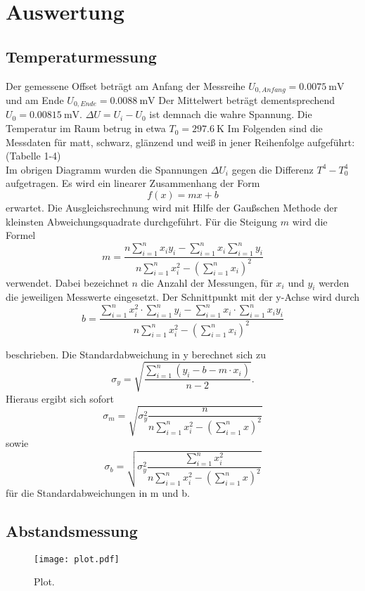 \section{Auswertung}
\label{sec:Auswertung}

\subsection{Temperaturmessung}
Der gemessene Offset beträgt am Anfang der Messreihe $U_{0,Anfang} = \SI{0,0075}{\milli\volt}$ und am Ende $U_{0,Ende} = \SI{0,0088}{\milli\volt}$
Der Mittelwert beträgt dementsprechend $U_0 = \SI{0.00815}{\milli\volt}$.
$\Delta U = U_i - U_0$ ist demnach die wahre Spannung.
Die Temperatur im Raum betrug in etwa $T_0 = \SI{297,6}{\kelvin}$
Im Folgenden sind die Messdaten für matt, schwarz, glänzend und weiß in jener Reihenfolge aufgeführt:
\\
(Tabelle 1-4)
\\
Im obrigen Diagramm wurden die Spannungen $\Delta U_i$ gegen die Differenz $T^4 - T_0^4$ aufgetragen.
Es wird ein linearer Zusammenhang der Form
\begin{equation}
  f(x) = mx + b
\end{equation}
erwartet.
Die Ausgleichsrechnung wird mit Hilfe der Gaußschen Methode der kleinsten Abweichungsquadrate durchgeführt.
Für die Steigung $m$ wird die Formel
\begin{equation}
  m = \frac{ n \sum_{i=1}^n x_i y_i - \sum_{i=1}^n x_i \sum_{i=1}^n y_i }{n\sum_{i=1}^n x_i^2 - ( \sum_{i=1}^n x_i )^2}
\end{equation}
verwendet. Dabei bezeichnet $n$ die Anzahl der Messungen, für $x_i$ und $y_i$ werden die jeweiligen Messwerte eingesetzt. Der Schnittpunkt mit der y-Achse wird durch
\begin{equation}
  b = \frac{ \sum_{i=1}^n x_i^2 \cdot \sum_{i=1}^n y_i - \sum_{i=1}^n x_i \cdot \sum_{i=1}^n x_i y_i}{n\sum_{i=1}^n x_i^2 - ( \sum_{i=1}^n x_i )^2}
\end{equation}

beschrieben.
Die Standardabweichung in y berechnet sich zu
\begin{equation}
  \sigma_y = \sqrt{ \frac {\sum_{i=1}^n (y_i-b-m \cdot x_i)}{n-2} }.
\end{equation}
Hieraus ergibt sich sofort
\begin{equation}
  \sigma_m = \sqrt{ \sigma_y^2 \frac{n}{n \sum_{i=1}^n x_i^2 - (\sum_{i=1}^n x)^2} }
\end{equation}
sowie
\begin{equation}
  \sigma_b = \sqrt{ \sigma_y^2 \frac{\sum_{i=1}^n x_i^2}{n \sum_{i=1}^n x_i^2 - (\sum_{i=1}^n x)^2} }
\end{equation}
für die Standardabweichungen in m und b.

\subsection{Abstandsmessung}


\begin{figure}
  \centering
  \texttt{[image: plot.pdf]}
  \caption{Plot.}
  \label{fig:plot}
\end{figure}
